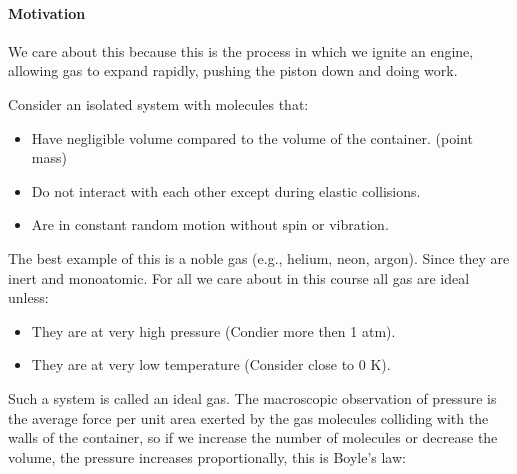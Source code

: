 \documentclass[11pt]{report}
\begin{document}
\begin{shaded}
\paragraph{Motivation} We care about this because this is the process in which we ignite an engine, allowing gas to expand rapidly, pushing the piston down and doing work.
\end{shaded}

\begin{definition}
    Consider an isolated system with molecules that:
    \begin{itemize}
        \item Have negligible volume compared to the volume of the container. (point mass)
        \item Do not interact with each other except during elastic collisions.
        \item Are in constant random motion without spin or vibration.
    \end{itemize}
    The best example of this is a noble gas (e.g., helium, neon, argon). Since they are inert and monoatomic. For all we care about in this course all gas are ideal unless:
    \begin{itemize}
        \item They are at very high pressure (Condier more then 1 atm).
        \item They are at very low temperature (Consider close to 0 K).
    \end{itemize}
\end{definition}

Such a system is called an ideal gas. The macroscopic observation of pressure is the average force per unit area exerted by the gas molecules colliding with the walls of the container, so if we increase the number of molecules or decrease the volume, the pressure increases proportionally, this is Boyle's law:
\end{document}
